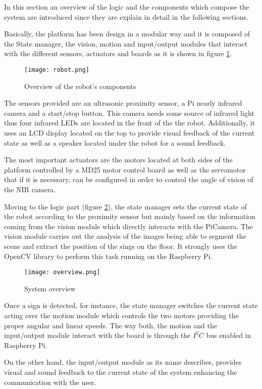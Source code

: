 In this section an overview of the logic and the components which compose the system are introduced since they are explain in detail in the following sections. 

Basically, the platform has been design in a modular way and it is composed of the State manager, the vision, motion and input/output modules that interact with the different sensors, actuators and boards as it is shown in figure \ref{fig:components}.

\begin{figure}[h!]
\centering
	\texttt{[image: robot.png]}
	\caption{Overview of the robot's components}
	\label{fig:components}
\end{figure}

The sensors provided are an ultrasonic proximity sensor, a Pi nearly infrared camera and a start/stop button. This camera needs some source of infrared light thus four infrared LEDs are located in the front of the the robot. Additionally, it uses an LCD display located on the top to provide visual feedback of the current state as well as a speaker located under the robot for a sound feedback.

\newpage
The most important actuators are the motors located at both sides of the platform controlled by a MD25 motor control board as well as the servomotor that if it is necessary, can be configured in order to control the angle of vision of the NIR camera.

Moving to the logic part (figure \ref{fig:overview}), the state manager sets the current state of the robot according to the proximity sensor but mainly based on the information coming from the vision module which directly interacts with the PiCamera. The vision module carries out the analysis of the images being able to segment the scene and extract the position of the sings on the floor. It strongly uses the OpenCV library to perform this task running on the Raspberry Pi. 

\begin{figure}[h!]
     \centering
     \texttt{[image: overview.png]}
     \caption{System overview}
     \label{fig:overview}
\end{figure}

Once a sign is detected, for instance, the state manager switches the current state acting over the motion module which controls the two motors providing the proper angular and linear speeds. The way both, the motion and the input/output module interact with the board is through the $I^2C$ bus enabled in Raspberry Pi.

On the other hand, the input/output module as its name describes, provides visual and sound feedback to the current state of the system enhancing the communication with the user.
